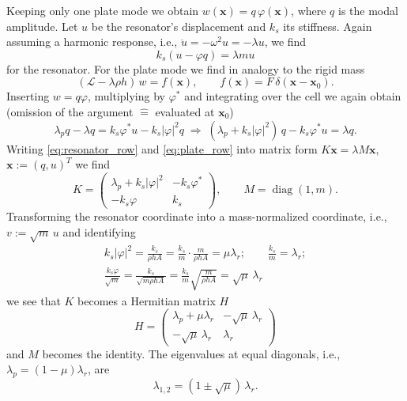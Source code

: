 Keeping only one plate mode we obtain $w(\mathbf{x}) = q\,\varphi(\mathbf{x})$,
where $q$ is the modal amplitude. Let $u$ be the resonator's displacement and
$k_s$ its stiffness. Again assuming a harmonic response, i.e.,
$\ddot{u} = -\omega^2 u = -\lambda u$, we find
\begin{equation}
  k_s(u - \varphi q) = \lambda m u
  \label{eq:resonator_row}
\end{equation}
for the resonator. For the plate mode we find in analogy to the rigid mass
\begin{equation}
  (\mathcal{L} - \lambda\rho h)\, w = f(\mathbf{x}) ,
  \qquad f(\mathbf{x}) = F\,\delta(\mathbf{x} - \mathbf{x}_0) .
\end{equation}
Inserting $w = q\varphi$, multiplying by $\varphi^*$ and integrating over the
cell we again obtain (omission of the argument $\mathrel{\widehat{=}}$ evaluated
at $\mathbf{x}_0$)
\begin{equation}
  \lambda_p q - \lambda q = k_s\varphi^* u - k_s|\varphi|^2 q
  \;\Rightarrow\;
  (\lambda_p + k_s|\varphi|^2)\, q - k_s\varphi^* u = \lambda q .
  \label{eq:plate_row}
\end{equation}
Writing \eqref{eq:resonator_row} and \eqref{eq:plate_row} into matrix form
$K\mathbf{x} = \lambda M\mathbf{x}$, $\mathbf{x} := (q, u)^T$ we find
\begin{equation}
  K = \begin{pmatrix}
        \lambda_p + k_s|\varphi|^2 & -k_s\varphi^* \\
        -k_s\varphi & k_s
      \end{pmatrix} ,
  \qquad
  M = \operatorname{diag}(1, m) .
\end{equation}
Transforming the resonator coordinate into a mass-normalized coordinate, i.e.,
$v := \sqrt{m}\,u$ and identifying
\begin{equation}
\begin{gathered}
  k_s|\varphi|^2 = \frac{k_s}{\rho h A} = \frac{k_s}{m}\cdot\frac{m}{\rho h A}
  = \mu\lambda_r ; \qquad \frac{k_s}{m} = \lambda_r ; \\
  \frac{k_s\varphi}{\sqrt{m}} = \frac{k_s}{\sqrt{m\rho h A}}
  = \frac{k_s}{m}\sqrt{\frac{m}{\rho h A}} = \sqrt{\mu}\,\lambda_r
\end{gathered}
\end{equation}
we see that $K$ becomes a Hermitian matrix $H$
\begin{equation}
  H = \begin{pmatrix}
        \lambda_p + \mu\lambda_r & -\sqrt{\mu}\,\lambda_r \\
        -\sqrt{\mu}\,\lambda_r & \lambda_r
      \end{pmatrix}
\end{equation}
and $M$ becomes the identity. The eigenvalues at equal diagonals, i.e.,
$\lambda_p = (1-\mu)\lambda_r$, are
\begin{equation}
  \lambda_{1,2} = (1 \pm \sqrt{\mu})\,\lambda_r .
\end{equation}

